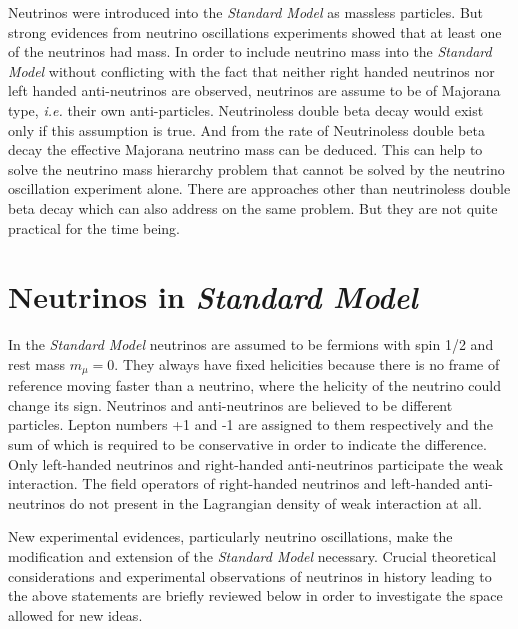 Neutrinos were introduced into the \emph{Standard Model} as massless particles. But strong evidences from neutrino oscillations experiments showed that at least one of the neutrinos had mass. In order to include neutrino mass into the \emph{Standard Model} without conflicting with the fact that neither right handed neutrinos nor left handed anti-neutrinos are observed, neutrinos are assume to be of Majorana type, \textit{i.e.} their own anti-particles. Neutrinoless double beta decay would exist only if this assumption is true. And from the rate of Neutrinoless double beta decay the effective Majorana neutrino mass can be deduced. This can help to solve the neutrino mass hierarchy problem that cannot be solved by the neutrino oscillation experiment alone. There are approaches other than neutrinoless double beta decay which can also address on the same problem. But they are not quite practical for the time being.

\section{Neutrinos in \emph{Standard Model}}
\label{sec:sm}
In the \emph{Standard Model} neutrinos are assumed to be fermions with spin 1/2 and rest mass $m_\mu=0$. They always have fixed helicities because there is no frame of reference moving faster than a neutrino, where the helicity of the neutrino could change its sign. Neutrinos and anti-neutrinos are believed to be different particles. Lepton numbers +1 and -1 are assigned to them respectively and the sum of which is required to be conservative in order to indicate the difference. Only left-handed neutrinos and right-handed anti-neutrinos participate the weak interaction. The field operators of right-handed neutrinos and left-handed anti-neutrinos do not present in the Lagrangian density of weak interaction at all.

New experimental evidences, particularly neutrino oscillations, make the modification and extension of the \emph{Standard Model} necessary. Crucial theoretical considerations and experimental observations of neutrinos in history leading to the above statements are briefly reviewed below in order to investigate the space allowed for new ideas.

